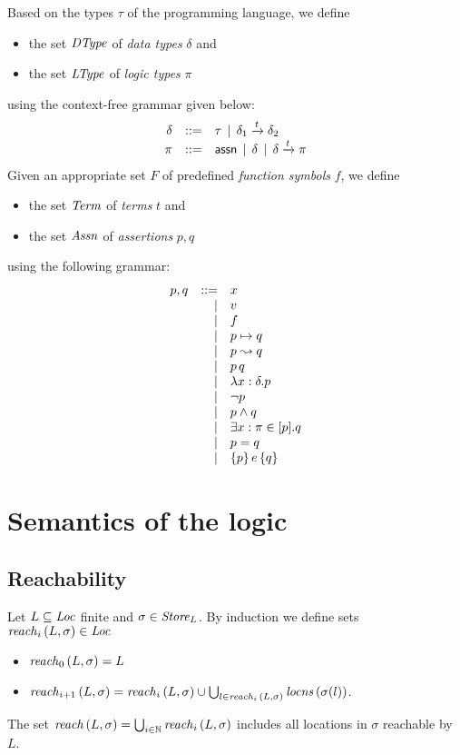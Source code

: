 \documentclass[12pt,a4paper]{report}
\begin{document}
Based on the types $\tau$ of the programming language, we define
\begin{itemize}
  \item the set $\mathit{DType}$ of {\em data types} $\delta$ and
  \item the set $\mathit{LType}$ of {\em logic types} $\pi$
\end{itemize}
using the context-free grammar given below:
\[\begin{array}{rrlll}
  \delta & ::= & \tau \,\mid\, \delta_1\xrightarrow{t}\delta_2 \\
  \pi & ::= & \mathsf{assn} \,\mid\, \delta \,\mid\, \delta\xrightarrow{t}\pi
\end{array}\]
Given an appropriate set $F$ of predefined {\em function symbols} $f$, we
define
\begin{itemize}
  \item the set $\mathit{Term}$ of {\em terms} $t$ and
  \item the set $\mathit{Assn}$ of {\em assertions} $p,q$
\end{itemize}
using the following grammar:
\[\begin{array}{rrlll}
  p,q & ::= & x
      \\ & \mid & v
      \\ & \mid & f
      \\ & \mid & p \mapsto q
      \\ & \mid & p \leadsto q
      \\ & \mid & p\,q
      \\ & \mid & \lambda x:\delta.p
      \\ & \mid & \neg p
      \\ & \mid & p \wedge q
      \\ & \mid & \exists x:\pi \in [p]. q
      \\ & \mid & p = q
      \\ & \mid & \{p\}\,e\,\{q\}
\end{array}\]



\section{Semantics of the logic}



\subsection{Reachability}


\begin{definition}[Reachability]
  Let $L\subseteq\mathit{Loc}$ finite and $\sigma\in\mathit{Store}_L$. By induction we define sets $\mathit{reach}_{i}\,(L,\sigma) \in \mathit{Loc}$
  \begin{itemize}
    \item $\mathit{reach}_{0}\,(L,\sigma) = L$
    \item $\mathit{reach}_{i+1}\,(L,\sigma) = \mathit{reach}_{i}\,(L,\sigma) \cup \bigcup_{l\in\mathit{reach}_{i}\,(L,\sigma)} \mathit{locns}\,(\sigma(l))$.
  \end{itemize}
  The set $\mathit{reach}\,(L,\sigma) = \bigcup_{i\in\mathbb N} \mathit{reach}_{i}\,(L,\sigma)$ includes all locations in $\sigma$ reachable
  by $L$.
\end{definition}
\end{document}
